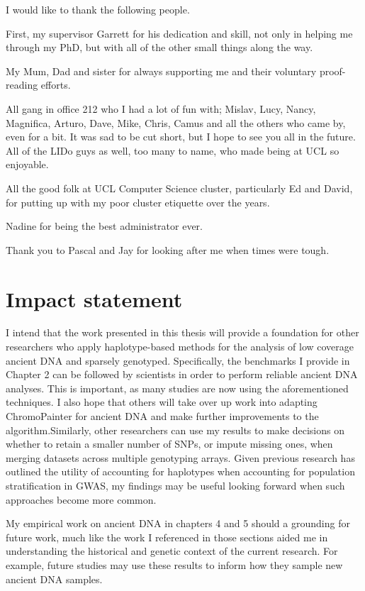 \begin{acknowledgements}
\noindent
I would like to thank the following people.

\noindent
First, my supervisor Garrett for his dedication and skill, not only in helping me through my PhD, but with all of the other small things along the way. 

\noindent
My Mum, Dad and sister for always supporting me and their voluntary proof-reading efforts.

\noindent
All gang in office 212 who I had a lot of fun with; Mislav, Lucy, Nancy, Magnifica, Arturo, Dave, Mike, Chris, Camus and all the others who came by, even for a bit. It was sad to be cut short, but I hope to see you all in the future. All of the LIDo guys as well, too many to name, who made being at UCL so enjoyable. 


\noindent
All the good folk at UCL Computer Science cluster, particularly Ed and David, for putting up with my poor cluster etiquette over the years. 

\noindent
Nadine for being the best administrator ever.

\noindent
Thank you to Pascal and Jay for looking after me when times were tough. 
\end{acknowledgements}


\section{Impact statement}

I intend that the work presented in this thesis will provide a foundation for other researchers who apply haplotype-based methods for the analysis of low coverage ancient DNA and sparsely genotyped. Specifically, the benchmarks I provide in Chapter 2 can be followed by scientists in order to perform reliable ancient DNA analyses. This is important, as many studies are now using the aforementioned techniques. I also hope that others will take over up work into adapting ChromoPainter for ancient DNA and make further improvements to the algorithm.Similarly, other researchers can use my results to make decisions on whether to retain a smaller number of SNPs, or impute missing ones, when merging datasets across multiple genotyping arrays. Given previous research has outlined the utility of accounting for haplotypes when accounting for population stratification in GWAS, my findings may be useful looking forward when such approaches become more common. 

My empirical work on ancient DNA in chapters 4 and 5 should a grounding for future work, much like the work I referenced in those sections aided me in understanding the historical and genetic context of the current research. For example, future studies may use these results to inform how they sample new ancient DNA samples. 

